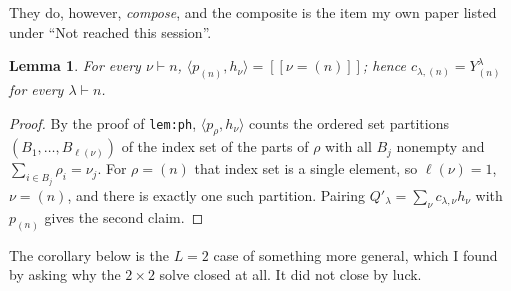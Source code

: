 \documentclass[11pt]{article}
\newtheorem{lemma}[theorem]{Lemma}
\theoremstyle{definition}
\newcommand{\lam}{\lambda}
\newcommand{\Qp}{Q'}
\newcommand{\lb}{[\![}
\newcommand{\rb}{]\!]}
\begin{document}
\noindent They do, however, \emph{compose}, and the composite is the item my own paper listed under
``Not reached this session''.

\begin{lemma}\label{lem:onepart}
For every $\nu\vdash n$, $\langle p_{(n)},h_\nu\rangle=\lb\nu=(n)\rb$; hence
$c_{\lam,(n)}=Y^{\lam}_{(n)}$ for every $\lam\vdash n$.
\end{lemma}
\begin{proof}
By the proof of \texttt{lem:ph}, $\langle p_\rho,h_\nu\rangle$ counts the ordered set partitions
$(B_1,\dots,B_{\ell(\nu)})$ of the index set of the parts of $\rho$ with all $B_j$ nonempty and
$\sum_{i\in B_j}\rho_i=\nu_j$. For $\rho=(n)$ that index set is a single element, so
$\ell(\nu)=1$, $\nu=(n)$, and there is exactly one such partition. Pairing
$\Qp_\lam=\sum_\nu c_{\lam,\nu}h_\nu$ with $p_{(n)}$ gives the second claim.
\end{proof}

The corollary below is the $L=2$ case of something more general, which I found by asking why the
$2\times2$ solve closed at all. It did not close by luck.
\end{document}
